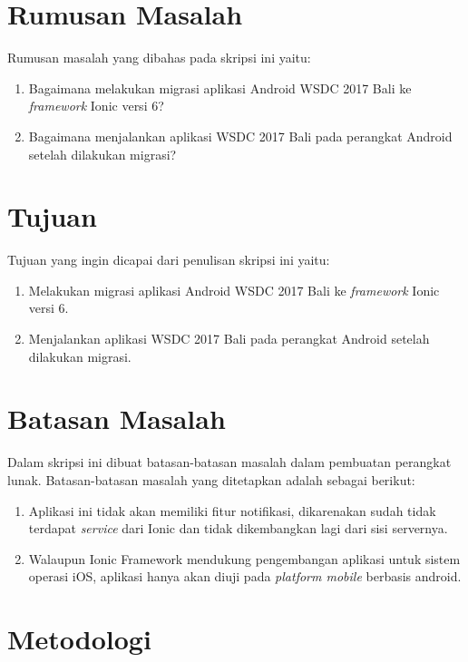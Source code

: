 \section{Rumusan Masalah}
\label{sec:rumusan}
Rumusan masalah yang dibahas pada skripsi ini yaitu:
\begin{enumerate}
	\item Bagaimana melakukan migrasi aplikasi Android WSDC 2017 Bali ke {\it framework} Ionic versi 6?
	\item Bagaimana menjalankan aplikasi WSDC 2017 Bali pada perangkat Android setelah dilakukan migrasi?
\end{enumerate}


\section{Tujuan}
\label{sec:tujuan}
Tujuan yang ingin dicapai dari penulisan skripsi ini yaitu:
\begin{enumerate}
	\item Melakukan migrasi aplikasi Android WSDC 2017 Bali ke {\it framework} Ionic versi 6.
	\item Menjalankan aplikasi WSDC 2017 Bali pada perangkat Android setelah dilakukan migrasi.
\end{enumerate}


\section{Batasan Masalah}
\label{sec:batasan}
Dalam skripsi ini dibuat batasan-batasan masalah dalam pembuatan perangkat lunak.  Batasan-batasan masalah yang ditetapkan adalah sebagai berikut:

\begin{enumerate}
    \item Aplikasi ini tidak akan memiliki fitur notifikasi, dikarenakan sudah tidak terdapat \textit{service} dari Ionic dan tidak dikembangkan lagi dari sisi servernya. 
    
    \item Walaupun Ionic Framework mendukung pengembangan aplikasi untuk sistem operasi iOS, aplikasi hanya akan diuji pada \textit{platform mobile} berbasis android.
    
\end{enumerate}


\section{Metodologi}
\label{sec:metlit}

